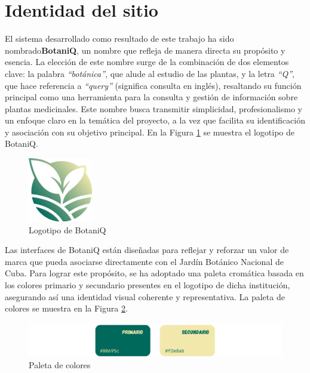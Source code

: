 \section{Identidad del sitio}
El sistema desarrollado como resultado de este trabajo ha sido nombrado\newline \textbf{BotaniQ}, un nombre 
que refleja de manera directa su propósito y esencia. La elección de este nombre surge de la 
combinación de dos elementos clave: la palabra \textit{``botánica''}, que alude al estudio de las plantas, 
y la letra \textit{``Q''}, que hace referencia a \textit{``query''} (significa consulta en inglés),
resaltando su función principal como una herramienta para la consulta y gestión de información sobre plantas medicinales. 
Este nombre busca transmitir simplicidad, profesionalismo y un enfoque claro en la temática del 
proyecto, a la vez que facilita su identificación y asociación con su objetivo principal.
En la Figura \ref{fig:botaniq} se muestra el logotipo de BotaniQ.

\begin{figure}[ht!]
    \centering
    \includegraphics[width=0.25\textwidth]{Images/botaniq.png}
    \caption{Logotipo de BotaniQ}
    \label{fig:botaniq}
\end{figure}

Las interfaces de BotaniQ están diseñadas para reflejar y reforzar un valor de marca que pueda 
asociarse directamente con el Jardín Botánico Nacional de Cuba. Para lograr este propósito, 
se ha adoptado una paleta cromática basada en los colores primario y secundario presentes en 
el logotipo de dicha institución, asegurando así una identidad visual coherente y representativa.
La paleta de colores se muestra en la Figura \ref{fig:palette}.

\begin{figure}[ht!]
    \centering
    \includegraphics[width=1\textwidth]{Images/palette.png}
    \caption{Paleta de colores}
    \label{fig:palette}
\end{figure}


